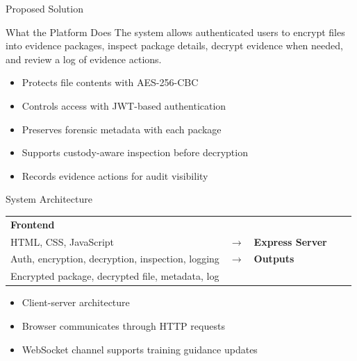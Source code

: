 \documentclass[aspectratio=169]{beamer}
\begin{document}
\begin{frame}{Proposed Solution}
    \begin{block}{What the Platform Does}
        The system allows authenticated users to encrypt files into evidence packages, inspect package details, decrypt evidence when needed, and review a log of evidence actions.
    \end{block}

    \begin{itemize}
        \item Protects file contents with AES-256-CBC
        \item Controls access with JWT-based authentication
        \item Preserves forensic metadata with each package
        \item Supports custody-aware inspection before decryption
        \item Records evidence actions for audit visibility
    \end{itemize}
\end{frame}

\begin{frame}{System Architecture}
    \begin{center}
    \renewcommand{\arraystretch}{1.4}
    \begin{tabular}{>{\centering\arraybackslash}m{}>{\centering\arraybackslash}m{}>{\centering\arraybackslash}m{}>{\centering\arraybackslash}m{}>{\centering\arraybackslash}m{}}
        \textbf{Frontend}\\
        HTML, CSS, JavaScript
        &
        $\rightarrow$
        &
        \textbf{Express Server}\\
        Auth, encryption, decryption, inspection, logging
        &
        $\rightarrow$
        &
        \textbf{Outputs}\\
        Encrypted package, decrypted file, metadata, log
    \end{tabular}
    \end{center}

    \vspace{0.4cm}

    \begin{itemize}
        \item Client-server architecture
        \item Browser communicates through HTTP requests
        \item WebSocket channel supports training guidance updates
    \end{itemize}
\end{frame}
\end{document}
